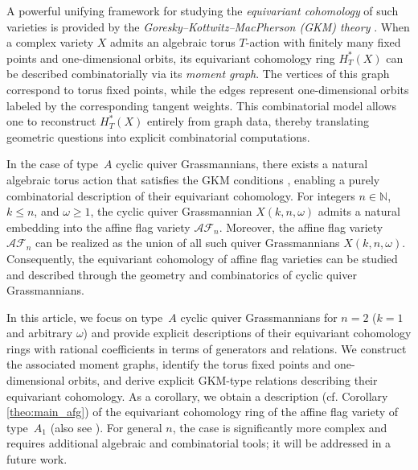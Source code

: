 \documentclass[10pt, a4paper, reqno]{amsart}
\begin{document}
A powerful unifying framework for studying the \emph{equivariant cohomology} of such varieties is provided by the \emph{Goresky--Kottwitz--MacPherson (GKM) theory} \cite{gkm, t05}. When a  complex variety $X$ admits an algebraic torus $T$-action with finitely many fixed points and one-dimensional orbits, its equivariant cohomology ring $H_T^*(X)$ can be described combinatorially via its \emph{moment graph}. The vertices of this graph correspond to torus fixed points, while the edges represent one-dimensional orbits labeled by the corresponding tangent weights. This combinatorial model allows one to reconstruct $H_T^*(X)$ entirely from graph data, thereby translating geometric questions into explicit combinatorial computations.

In the case of type~$A$ cyclic quiver Grassmannians, there exists a natural algebraic torus action that satisfies the GKM conditions \cite{lp23, lp231}, enabling a purely combinatorial description of their equivariant cohomology. For integers $n \in \mathbb{N}$, $k \leq n$, and $\omega \geq 1$, the cyclic quiver Grassmannian $X(k,n,\omega)$ admits a natural embedding into the affine flag variety $\mathscr{AF}_n$. Moreover, the affine flag variety $\mathscr{AF}_n$ can be realized as the union of all such quiver Grassmannians $X(k,n,\omega)$. Consequently, the equivariant cohomology of affine flag varieties can be studied and described through the geometry and combinatorics of cyclic quiver Grassmannians.

In this article, we focus on type~$A$ cyclic quiver Grassmannians for $n=2$ ($k=1$ and arbitrary $\omega$) and provide explicit descriptions of their equivariant cohomology rings with rational coefficients in terms of generators and relations. We construct the associated moment graphs, identify the torus fixed points and one-dimensional orbits, and derive explicit GKM-type relations describing their equivariant cohomology. As a corollary, we obtain a description (cf. Corollary \ref{theo:main_afg}) of the equivariant cohomology ring of the affine flag variety of type~$A_1$ (also see \cite{Ande, yun, park2017gkm}). For general $n$, the case is significantly more complex and requires additional algebraic and combinatorial tools; it will be addressed in a future work.

\end{document}
